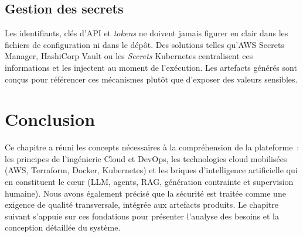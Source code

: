 \subsection{Gestion des secrets}

Les identifiants, clés d'API et \textit{tokens} ne doivent jamais figurer en clair dans les
fichiers de configuration ni dans le dépôt. Des solutions telles qu'AWS Secrets Manager,
HashiCorp Vault ou les \textit{Secrets} Kubernetes centralisent ces informations et les
injectent au moment de l'exécution. Les artefacts générés sont conçus pour référencer ces
mécanismes plutôt que d'exposer des valeurs sensibles.

\section{Conclusion}

Ce chapitre a réuni les concepts nécessaires à la compréhension de la plateforme~: les
principes de l'ingénierie Cloud et DevOps, les technologies cloud mobilisées (AWS,
Terraform, Docker, Kubernetes) et les briques d'intelligence artificielle qui en constituent
le c\oe ur (LLM, agents, RAG, génération contrainte et supervision humaine). Nous avons
également précisé que la sécurité est traitée comme une exigence de qualité transversale,
intégrée aux artefacts produits. Le chapitre suivant s'appuie sur ces fondations pour
présenter l'analyse des besoins et la conception détaillée du système.
